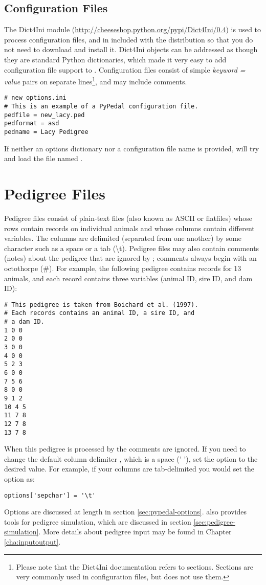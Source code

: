 \subsection{Configuration Files}
\label{sec:pypedal-options-file}
The Dict4Ini module (\url{http://cheeseshop.python.org/pypi/Dict4Ini/0.4}) is used to process configuration files, and in included with the distribution so that you do not need to download and install it.  Dict4Ini objects can be addressed as though they are standard Python dictionaries, which made it very easy to add configuration file support to \PyPedal{}.  Configuration files consist of simple \emph{keyword = value} pairs on separate lines\footnote{Please note that the Dict4Ini documentation refers to sections.  Sections are very commonly used in configuration files, but \PyPedal{} does not use them.}, and may include comments.
\begin{verbatim}
# new_options.ini
# This is an example of a PyPedal configuration file.
pedfile = new_lacy.ped
pedformat = asd
pedname = Lacy Pedigree
\end{verbatim}
If neither an options dictionary nor a configuration file name is provided,  will try and load the file named .
\section{Pedigree Files}
\label{sec:pedigree-files}
Pedigree files consist of plain-text files (also known as ASCII or flatfiles) whose rows contain
records on individual animals and whose columns contain different variables.  The columns are
delimited (separated from one another) by some character such as a space or a tab (\textbackslash{}t).  Pedigree
files may also contain comments (notes) about the pedigree that are ignored by \PyPedal{}; comments
always begin with an octothorpe (\#).  For example, the following pedigree contains records for 13
animals, and each record contains three variables (animal ID, sire ID, and dam ID):
\begin{verbatim}
# This pedigree is taken from Boichard et al. (1997).
# Each records contains an animal ID, a sire ID, and
# a dam ID.
1 0 0
2 0 0
3 0 0
4 0 0
5 2 3
6 0 0
7 5 6
8 0 0
9 1 2
10 4 5
11 7 8
12 7 8
13 7 8
\end{verbatim}
When this pedigree is processed by \PyPedal{} the comments are ignored.  If you need to change the
default column delimiter , which is a space (' '), set the  option to the desired
value.  For example, if your columns are tab-delimited you would set the option as:
\begin{verbatim}
options['sepchar'] = '\t'
\end{verbatim}
Options are discussed at length in section \ref{sec:pypedal-options}. \PyPedal{} also provides tools for pedigree simulation, which are discussed in section \ref{sec:pedigree-simulation}. More details about pedigree input may be found in Chapter \ref{cha:inputoutput}.
